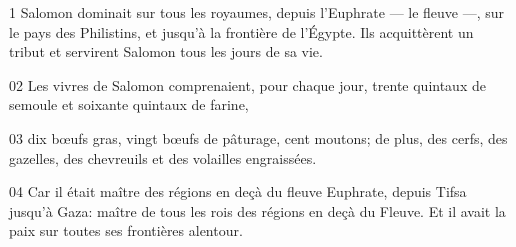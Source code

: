 1 Salomon dominait sur tous les royaumes, depuis l’Euphrate --- le fleuve ---, sur le pays des Philistins, et jusqu’à la frontière de l’Égypte. Ils acquittèrent un tribut et servirent Salomon tous les jours de sa vie.

02 Les vivres de Salomon comprenaient, pour chaque jour, trente quintaux de semoule et soixante quintaux de farine,

03 dix bœufs gras, vingt bœufs de pâturage, cent moutons; de plus, des cerfs, des gazelles, des chevreuils et des volailles engraissées.

04 Car il était maître des régions en deçà du fleuve Euphrate, depuis Tifsa jusqu’à Gaza: maître de tous les rois des régions en deçà du Fleuve. Et il avait la paix sur toutes ses frontières alentour.
